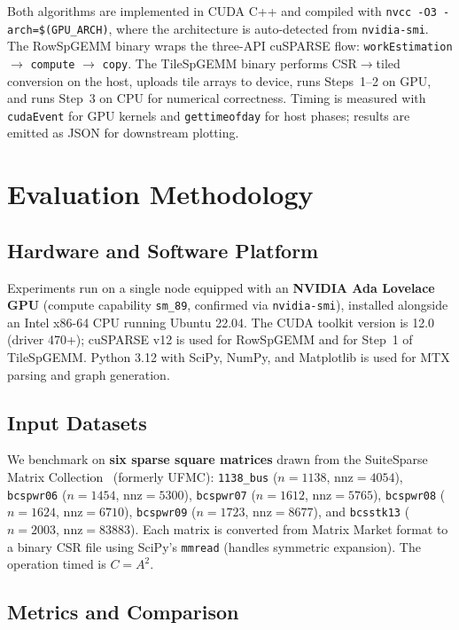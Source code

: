 \documentclass[conference]{IEEEtran}
\begin{document}
Both algorithms are implemented in CUDA C++ and compiled with
\texttt{nvcc -O3 -arch=\$(GPU\_ARCH)}, where the architecture is
auto-detected from \texttt{nvidia-smi}.
The RowSpGEMM binary wraps the three-API cuSPARSE flow:
\texttt{workEstimation} $\to$ \texttt{compute} $\to$ \texttt{copy}.
The TileSpGEMM binary performs CSR$\to$tiled conversion on the host,
uploads tile arrays to device, runs Steps~1--2 on GPU, and runs Step~3
on CPU for numerical correctness.
Timing is measured with \texttt{cudaEvent} for GPU kernels and
\texttt{gettimeofday} for host phases; results are emitted as JSON for
downstream plotting.

\section{Evaluation Methodology}

\subsection{Hardware and Software Platform}

Experiments run on a single node equipped with an
\textbf{NVIDIA Ada Lovelace GPU} (compute capability \texttt{sm\_89},
confirmed via \texttt{nvidia-smi}), installed alongside an Intel x86-64
CPU running Ubuntu 22.04.
The CUDA toolkit version is 12.0 (driver 470+); cuSPARSE v12 is used for
RowSpGEMM and for Step~1 of TileSpGEMM.
Python 3.12 with SciPy, NumPy, and Matplotlib is used for MTX parsing
and graph generation.

\subsection{Input Datasets}

We benchmark on \textbf{six sparse square matrices} drawn from the
SuiteSparse Matrix Collection~\cite{suitesparse} (formerly UFMC):
\texttt{1138\_bus} ($n=1138$, nnz$=4054$),
\texttt{bcspwr06} ($n=1454$, nnz$=5300$),
\texttt{bcspwr07} ($n=1612$, nnz$=5765$),
\texttt{bcspwr08} ($n=1624$, nnz$=6710$),
\texttt{bcspwr09} ($n=1723$, nnz$=8677$), and
\texttt{bcsstk13} ($n=2003$, nnz$=83883$).
Each matrix is converted from Matrix Market format to a binary CSR file
using SciPy's \texttt{mmread} (handles symmetric expansion).
The operation timed is $C = A^2$.

\subsection{Metrics and Comparison}
\end{document}
